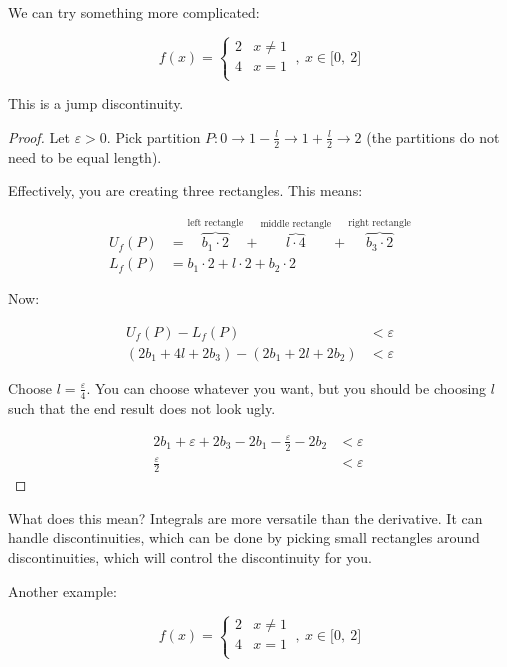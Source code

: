 \documentclass[12pt]{article}
\theoremstyle{plain}
\theoremstyle{remark}
\theoremstyle{definition}
\begin{document}
We can try something more complicated:

\[f(x) = \left\{ \begin{matrix}
2 & x \neq 1 \\
4 & x = 1 \\
\end{matrix} \right.\ ,\ x \in \lbrack 0,\ 2\rbrack\]


This is a jump discontinuity.


\begin{proof} Let \(\varepsilon > 0\). Pick partition
\(P:0 \rightarrow 1 - \frac{l}{2} \rightarrow 1 + \frac{l}{2} \rightarrow 2\)
(the partitions do not need to be equal length).

Effectively, you are creating three rectangles. This means:

\begin{align*}
U_{f}(P) &= \overset{\text{left\ rectangle}}{\overbrace{b_{1} \cdot 2}} + \overset{\text{middle\ rectangle}}{\overbrace{l \cdot 4}} + \overset{\text{right\ rectangle}}{\overbrace{b_{3} \cdot 2}} \\
L_{f}(P) &= b_{1} \cdot 2 + l \cdot 2 + b_{2} \cdot 2
\end{align*}


Now:

\begin{align*}
U_{f}(P) - L_{f}(P) &< \varepsilon \\
\left( 2b_{1} + 4l + 2b_{3} \right) - \left( 2b_{1} + 2l + 2b_{2} \right) &< \varepsilon
\end{align*}


Choose \(l = \frac{\varepsilon}{4}\). You can choose whatever you want,
but you should be choosing \(l\) such that the end result does not look
ugly.

\begin{align*}
2b_{1} + \varepsilon + 2b_{3} - 2b_{1} - \frac{\varepsilon}{2} - 2b_{2} &< \varepsilon \\
\frac{\varepsilon}{2} &< \varepsilon\
\end{align*}

\end{proof}

What does this mean? Integrals are more versatile than the derivative.
It can handle discontinuities, which can be done by picking small
rectangles around discontinuities, which will control the discontinuity
for you.

Another example:

\[f(x) = \left\{ \begin{matrix}
2 & x \neq 1 \\
4 & x = 1 \\
\end{matrix} \right.\ ,\ x \in \lbrack 0,\ 2\rbrack\]
\end{document}
